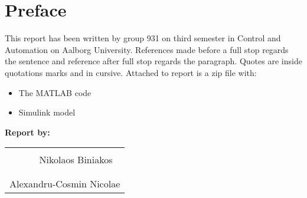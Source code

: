 \chapter*{Preface}
This report has been written by group 931 on third semester in Control and Automation on Aalborg University.
References made before a full stop regards the sentence and reference after full stop regards the paragraph. Quotes are inside quotations marks and in cursive.
Attached to report is a zip file with:
\begin{itemize}
	\item The MATLAB code 
	\item Simulink model
\end{itemize}
\vspace{2cm}

\textbf{Report by:}\\
\vspace{-5pt}
\begin{table}[H]
	\centering
	\begin{tabular}{c c c}
		\underline{\phantom{JAERJAERJAERJAERGO}} & \phantom{cookies} & \underline{\phantom{JAERJAERJAERJAERGO}} \\
		 		& \phantom{cookies} &  Nikolaos Biniakos	\\
		&&\\
		\multicolumn{3}{c}{\underline{\phantom{JAERJAERJAERJAERGO}}}\\
		\multicolumn{3}{c}{Alexandru-Cosmin Nicolae}\\				
						
	\end{tabular}
\end{table}


\pagebreak
